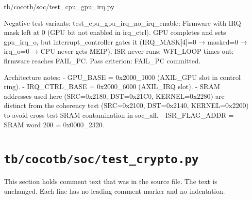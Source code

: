 \begin{relocated}{tb/cocotb/soc/test_cpu_gpu_irq.py}
\begin{textblock}
Negative test variants:
test_cpu_gpu_irq_no_irq_enable:
Firmware with IRQ mask left at 0 (GPU bit not enabled in irq_ctrl).
GPU completes and sets gpu_irq_o, but interrupt_controller gates it
(IRQ_MASK[4]=0 → masked=0 → irq_o=0 → CPU never gets MEIP).
ISR never runs; WFI_LOOP times out; firmware reaches FAIL_PC.
Pass criterion: FAIL_PC committed.

Architecture notes:
- GPU_BASE = 0x2000_1000  (AXIL_GPU slot in control ring).
- IRQ_CTRL_BASE = 0x2000_6000 (AXIL_IRQ slot).
- SRAM addresses used here (SRC=0x2180, DST=0x21C0, KERNEL=0x2280)
are distinct from the coherency test (SRC=0x2100, DST=0x2140,
KERNEL=0x2200) to avoid cross-test SRAM contamination in soc_all.
- ISR_FLAG_ADDR = SRAM word 200 = 0x0000_2320.
\end{textblock}

\end{relocated}

\section{\texttt{tb/cocotb/soc/test\_crypto.py}}\label{tm:suite:soc-test-crypto}

This section holds comment text that was in the source file. The text is unchanged. Each line has no leading comment marker and no indentation.

